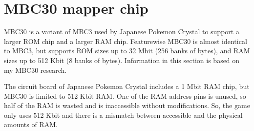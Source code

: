 \documentclass[\main/gbctr.tex]{subfiles}
\begin{document}
\chapter{MBC30 mapper chip}

MBC30 is a variant of MBC3 used by Japanese Pokemon Crystal to support a larger
ROM chip and a larger RAM chip. Featurewise MBC30 is almost identical to MBC3,
but supports ROM sizes up to 32 Mbit (256 banks of  bytes), and RAM
sizes up to 512 Kbit (8 banks of  bytes).  Information in this
section is based on my MBC30 research.

\begin{warning}
  The circuit board of Japanese Pokemon Crystal includes a 1 Mbit RAM chip, but
  MBC30 is limited to 512 Kbit RAM. One of the RAM address pins is unused, so
  half of the RAM is wasted and is inaccessible without modifications. So, the
  game only uses 512 Kbit and there is a mismatch between accessible and the
  physical amounts of RAM.
\end{warning}
\end{document}
